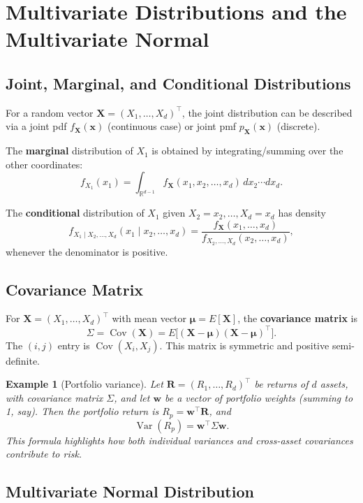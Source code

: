 \documentclass[11pt,a4paper]{article}
\newtheorem{example}{Example}[section]
\begin{document}
\newpage

\section{Multivariate Distributions and the Multivariate Normal}

\subsection{Joint, Marginal, and Conditional Distributions}

For a random vector $\bm{X} = (X_1,\dots,X_d)^\top$, the joint distribution can be described via a joint pdf $f_{\bm{X}}(\bm{x})$ (continuous case) or joint pmf $p_{\bm{X}}(\bm{x})$ (discrete). 

The \textbf{marginal} distribution of $X_1$ is obtained by integrating/summing over the other coordinates:
\[
f_{X_1}(x_1)
= \int_{\mathbb{R}^{d-1}} f_{\bm{X}}(x_1,x_2,\dots,x_d)\,dx_2\cdots dx_d.
\]

The \textbf{conditional} distribution of $X_1$ given $X_2=x_2,\dots,X_d=x_d$ has density
\[
f_{X_1 \mid X_2,\dots,X_d}(x_1 \mid x_2,\dots,x_d)
= \frac{f_{\bm{X}}(x_1,\dots,x_d)}{f_{X_2,\dots,X_d}(x_2,\dots,x_d)},
\]
whenever the denominator is positive.

\subsection{Covariance Matrix}

For $\bm{X} = (X_1,\dots,X_d)^\top$ with mean vector $\bm{\mu} = E[\bm{X}]$, the \textbf{covariance matrix} is
\[
\Sigma = \operatorname{Cov}(\bm{X})
= E\big[(\bm{X}-\bm{\mu})(\bm{X}-\bm{\mu})^\top\big].
\]
The $(i,j)$ entry is $\operatorname{Cov}(X_i,X_j)$. 
This matrix is symmetric and positive semi-definite.

\begin{example}[Portfolio variance]
Let $\bm{R}=(R_1,\dots,R_d)^\top$ be returns of $d$ assets, with covariance matrix $\Sigma$, and let $\bm{w}$ be a vector of portfolio weights (summing to 1, say). 
Then the portfolio return is $R_p = \bm{w}^\top \bm{R}$, and
\[
\operatorname{Var}(R_p) = \bm{w}^\top \Sigma \bm{w}.
\]
This formula highlights how both individual variances and cross-asset covariances contribute to risk.

\end{example}

\subsection{Multivariate Normal Distribution}
\end{document}
